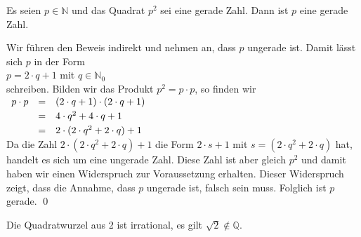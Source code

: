 \begin{Lemma} \label{lemma:b1}
  Es seien $p \in \mathbb{N}$ und das Quadrat $p^2$ sei eine gerade Zahl.
  Dann ist $p$ eine gerade Zahl.
\end{Lemma}

\proof
Wir führen den Beweis indirekt und nehmen an, dass $p$ ungerade ist.  Damit lässt sich $p$  in der Form
\\[0.2cm]
\hspace*{1.3cm}
$p = 2 \cdot q + 1$ \quad mit \quad $q \in \mathbb{N}_0$
\\[0.2cm]
schreiben.  Bilden wir das Produkt $p^2 = p \cdot p$, so finden wir
\\[0.2cm]
\hspace*{1.3cm}
$
\begin{array}[t]{rcl}
  p \cdot p & = & (2 \cdot q + 1) \cdot (2 \cdot q + 1) \\[0.1cm]
            & = & 4 \cdot q^2 + 4 \cdot q + 1           \\[0.1cm]
            & = & 2 \cdot (2 \cdot q^2 + 2 \cdot q) + 1 
\end{array}
$
\\[0.2cm]
Da die Zahl $2 \cdot (2 \cdot q^2 + 2 \cdot q) + 1$ die Form $2 \cdot s + 1$ mit
$s = (2 \cdot q^2 + 2 \cdot q)$ hat, handelt es sich um eine ungerade Zahl.
Diese Zahl ist aber gleich $p^2$ und damit haben wir einen Widerspruch zur
Voraussetzung erhalten.  Dieser Widerspruch zeigt, dass die Annahme, dass $p$ ungerade ist, falsch
sein muss.  Folglich ist $p$ gerade.
\qed

\begin{Satz}
  Die Quadratwurzel aus 2 ist irrational, es gilt $\sqrt{2} \not\in \mathbb{Q}$.
\end{Satz}

